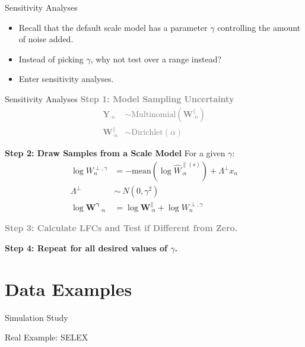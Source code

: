 \documentclass[
  ignorenonframetext,
]{beamer}
\begin{document}
\begin{frame}{Sensitivity Analyses}
\protect\hypertarget{sensitivity-analyses}{}
\begin{itemize}
\item
  Recall that the default scale model has a parameter \(\gamma\)
  controlling the amount of noise added.
\item
  Instead of picking \(\gamma\), why not test over a range instead?
\item
  Enter sensitivity analyses.
\end{itemize}
\end{frame}

\begin{frame}{Sensitivity Analyses}
\protect\hypertarget{sensitivity-analyses-1}{}
\textcolor{gray}{\textbf{Step 1: Model Sampling Uncertainty}}
\textcolor{gray}{\begin{align*}
\mathbf{Y}_{\cdot n} &\sim \text{Multinomial}(\mathbf{W}_{\cdot n}^\parallel)\\
\mathbf{W}_{\cdot n}^\parallel &\sim \text{Dirichlet}(\alpha)
\end{align*}}

\textbf{Step 2: Draw Samples from a Scale Model} For a given \(\gamma\):
\begin{align*}
\log W_{n}^{\perp, \gamma} &= - \mathrm{mean} \left(\log \hat{W}^{\parallel (s)}_{\cdot n}\right) + \Lambda^\perp x_{n}\\
\Lambda^\perp  &\sim \ N(0, \gamma^2)\\
\log \mathbf{W^\gamma}_{\cdot n} &= \log \mathbf{W}_{\cdot n}^\parallel + \log W_{n}^{\perp, \gamma}
\end{align*}

\textcolor{gray}{\textbf{Step 3: Calculate LFCs and Test if Different from Zero.}}

\textbf{Step 4: Repeat for all desired values of $\gamma$.}
\end{frame}

\hypertarget{data-examples}{%
\section{Data Examples}\label{data-examples}}

\begin{frame}{Simulation Study}
\protect\hypertarget{simulation-study}{}
\end{frame}

\begin{frame}{Real Example: SELEX}
\protect\hypertarget{real-example-selex}{}
\end{frame}
\end{document}
